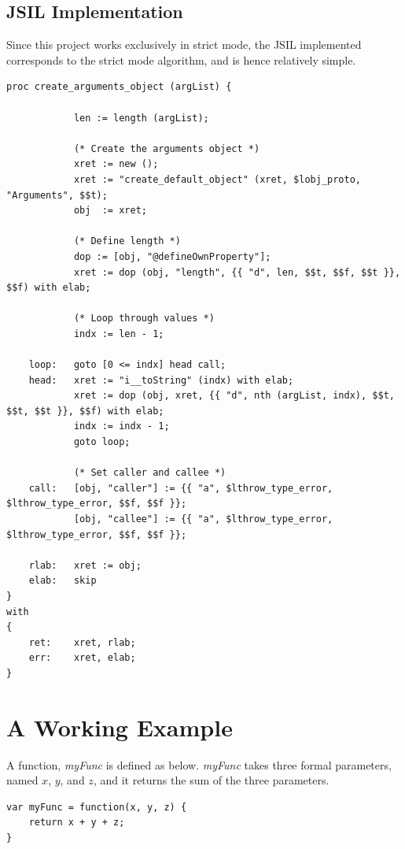 \documentclass[a4paper,11pt,twoside]{report}
\begin{document}
\subsection{JSIL Implementation}
Since this project works exclusively in strict mode, the JSIL implemented corresponds to the strict mode algorithm, and is hence relatively simple.
\begin{adjustwidth}{2cm}{2cm}
\begin{lstlisting}
proc create_arguments_object (argList) { 

			len := length (argList);
			
			(* Create the arguments object *)
			xret := new ();
			xret := "create_default_object" (xret, $lobj_proto, "Arguments", $$t);
			obj  := xret;

			(* Define length *)
			dop := [obj, "@defineOwnProperty"];
			xret := dop (obj, "length", {{ "d", len, $$t, $$f, $$t }}, $$f) with elab;		
			
			(* Loop through values *)
			indx := len - 1;
			
	loop:	goto [0 <= indx] head call;
	head:	xret := "i__toString" (indx) with elab;
			xret := dop (obj, xret, {{ "d", nth (argList, indx), $$t, $$t, $$t }}, $$f) with elab;
			indx := indx - 1;
			goto loop;
			
			(* Set caller and callee *)
	call:	[obj, "caller"] := {{ "a", $lthrow_type_error, $lthrow_type_error, $$f, $$f }};
			[obj, "callee"] := {{ "a", $lthrow_type_error, $lthrow_type_error, $$f, $$f }};

	rlab:	xret := obj;
	elab:	skip
}
with
{
	ret:	xret, rlab;
	err:	xret, elab;
}
\end{lstlisting}
\end{adjustwidth}

\section{A Working Example}
A function, \textit{myFunc} is defined as below. \textit{myFunc} takes three formal parameters, named $x$, $y$, and $z$, and it returns the sum of the three parameters.
\begin{adjustwidth}{2cm}{2cm}
\begin{lstlisting}
var myFunc = function(x, y, z) {
	return x + y + z;
}
\end{lstlisting}
\end{adjustwidth}
\end{document}
